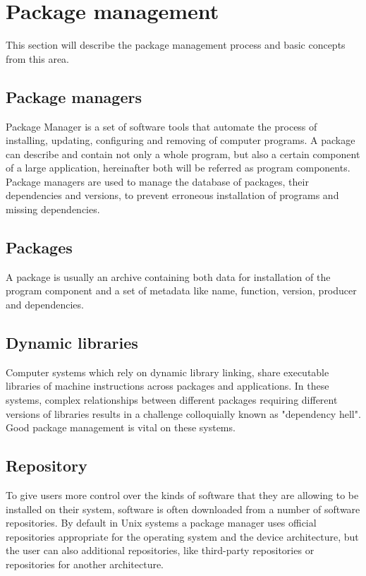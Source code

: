 \section{Package management} \label{sec:pm}
This section will describe the package management process and basic concepts from this area.
\subsection*{Package managers}
Package Manager is a set of software tools that automate the process of installing, updating, configuring and removing of computer programs.
A package can describe and contain not only a whole program, but also a certain component of a large application, hereinafter both will be referred as program components.
Package managers are used to manage the database of packages, their dependencies and versions, to prevent erroneous installation of programs and missing dependencies.
\subsection*{Packages}
A package is usually an archive containing both data for installation of the program component and a set of metadata like name, function, version, producer and dependencies.
\subsection*{Dynamic libraries}
Computer systems which rely on dynamic library linking, share executable libraries of machine instructions across packages and applications. 
In these systems, complex relationships between different packages requiring different versions of libraries results in a challenge colloquially known as "dependency hell".
Good package management is vital on these systems.
\subsection*{Repository}
To give users more control over the kinds of software that they are allowing to be installed on their system, software is often downloaded from a number of software repositories.
By default in Unix systems a package manager uses official repositories appropriate for the operating system and the device architecture, but the user can also additional repositories, like third-party repositories or repositories for another architecture.
